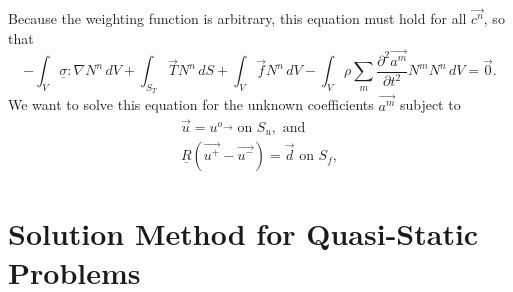  Because the weighting function is arbitrary, this equation must hold
for all $\overrightarrow{c^{n}}$, so that
\begin{equation}
-\int_{V}\underline{\sigma}:\nabla N^{n}\, dV+\int_{S_{T}}\vec{T}N^{n}\, dS+\int_{V}\vec{f}N^{n}\, dV-\int_{V}\rho\sum_{m}\frac{\partial^{2}\overrightarrow{a^{m}}}{\partial t^{2}}N^{m}N^{n}\, dV=\vec{0}.
\end{equation}
We want to solve this equation for the unknown coefficients $\overrightarrow{a^{m}}$
subject to
\begin{gather}
\vec{u}=u^{o}\overrightarrow{}\text{ on }S_{u},\text{ and}\\
\underline{R}(\overrightarrow{u^{+}}-\overrightarrow{u^{-}})=\vec{d}\text{ on }S_{f},
\end{gather}

\section{Solution Method for Quasi-Static Problems}

